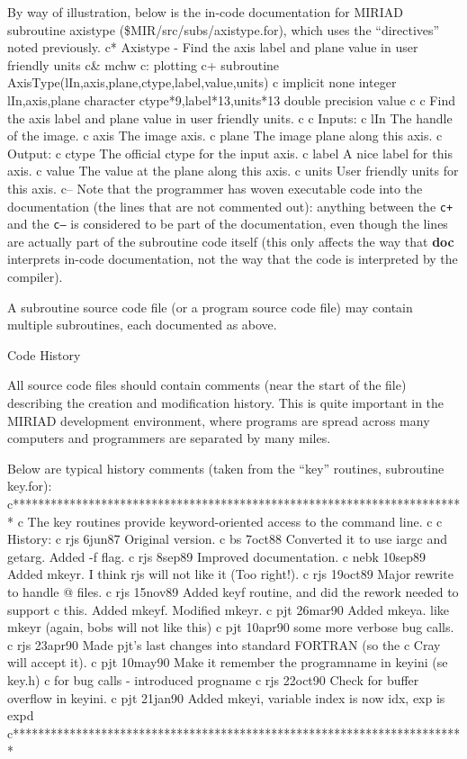 By way of illustration, below is the in-code documentation for
MIRIAD subroutine axistype (\$MIR/src/subs/axistype.for),
which uses the ``directives'' noted previously.
{\ninepoint\begintt
c* Axistype - Find the axis label and plane value in user friendly units
c& mchw
c: plotting
c+
        subroutine AxisType(lIn,axis,plane,ctype,label,value,units)
c
        implicit none
        integer lIn,axis,plane
        character ctype*9,label*13,units*13
        double precision value
c
c Find the axis label and plane value in user friendly units.
c
c  Inputs:
c    lIn        The handle of the image.
c    axis       The image axis.
c    plane      The image plane along this axis.
c  Output:
c    ctype      The official ctype for the input axis.
c    label      A nice label for this axis.
c    value      The value at the plane along this axis.
c    units      User friendly units for this axis.
c--
\endtt}
Note that the programmer has woven executable code into the documentation
(the lines that are not commented out):  anything between the {\tt c+} and
the {\tt c--} is considered to be part of the documentation, even though
the lines are actually part of the subroutine code itself (this only
affects the way that {\bf doc} interprets in-code documentation, not the
way that the code is interpreted by the compiler).

A subroutine source code file (or a program source code file) may contain
multiple subroutines, each documented as above.

\beginsection Code History

All source code files should contain comments (near the start of the file)
describing the creation and modification history.  This is quite important
in the MIRIAD development environment, where programs are spread
across many computers and programmers are separated by many miles.

Below are typical history comments (taken from the ``key'' routines,
subroutine key.for):
{\ninepoint\begintt
c************************************************************************
c  The key routines provide keyword-oriented access to the command line.
c
c  History:
c    rjs    6jun87    Original version.
c    bs     7oct88    Converted it to use iargc and getarg. Added -f flag.
c    rjs    8sep89    Improved documentation.
c    nebk  10sep89    Added mkeyr.  I think rjs will not like it (Too right!).
c    rjs   19oct89    Major rewrite to handle @ files.
c    rjs   15nov89    Added keyf routine, and did the rework needed to support
c                     this. Added mkeyf. Modified mkeyr.
c    pjt   26mar90    Added mkeya. like mkeyr (again, bobs will not like this)
c    pjt   10apr90    some more verbose bug calls.
c    rjs   23apr90    Made pjt's last changes into standard FORTRAN (so the
c                     Cray will accept it).
c    pjt   10may90    Make it remember the programname in keyini (se key.h)
c                     for bug calls - introduced progname
c    rjs   22oct90    Check for buffer overflow in keyini.
c    pjt   21jan90    Added mkeyi, variable index is now idx, exp is expd
c************************************************************************
\endtt}

